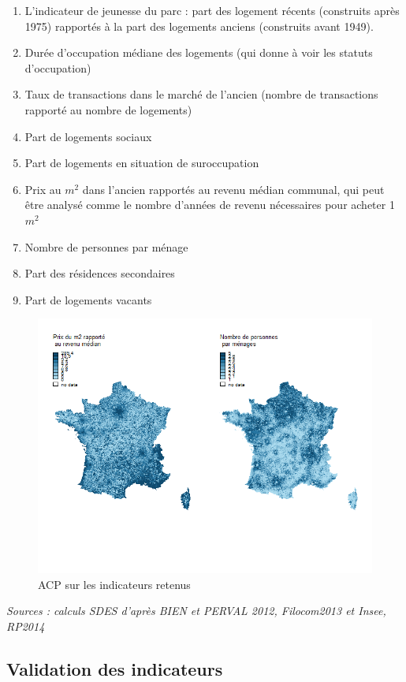 \documentclass[12pt, a4paper]{article}
\begin{document}
\begin{enumerate}
\item L'indicateur de jeunesse du parc : part des logement récents (construits après 1975) rapportés à la part des logements anciens (construits avant 1949). 
\item Durée d'occupation médiane des logements (qui donne à voir les statuts d'occupation)
\item Taux de transactions dans le marché de l'ancien (nombre de transactions rapporté au nombre de logements)
\item Part de logements sociaux
\item Part de logements en situation de suroccupation
\item Prix au $m^2$ dans l'ancien rapportés au revenu médian communal, qui peut être analysé comme le nombre d'années de revenu nécessaires pour acheter 1 $m^2$
\item Nombre de personnes par ménage
\item Part des résidences secondaires
\item Part de logements vacants
\end{enumerate}

\begin{figure}[H]
\caption{ACP sur les indicateurs retenus}
\begin{center}
\includegraphics[scale=.8]{img/Indic_comm.png}
\end{center}
\end{figure}
\emph{Sources : calculs SDES d'après BIEN et PERVAL 2012, Filocom2013 et Insee, RP2014}
\subsection{Validation des indicateurs}
\end{document}

